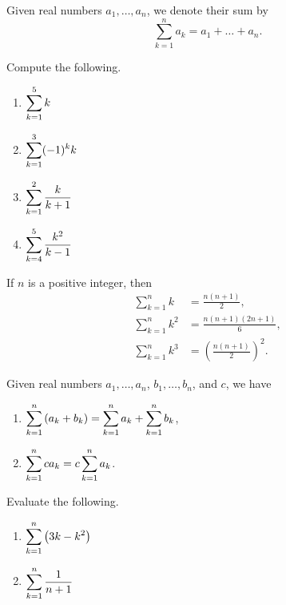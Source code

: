 \setcounter{chapter}{5}
\setcounter{section}{2}
\setcounter{theorem}{0}
\setcounter{equation}{0}


\begin{definition}
Given real numbers $a_1,\dots, a_n$, we denote their sum by
\begin{equation*}
\sum_{k=1}^na_k = a_1+\dots + a_n.
\end{equation*}
\end{definition}

\begin{example}
Compute the following.
\begin{enumerate}
\item $\displaystyle\sum_{k=1}^5 k$
\vfill
\item $\displaystyle\sum_{k=1}^3 (-1)^kk$
\vfill
\item $\displaystyle\sum_{k=1}^2 \frac{k}{k+1}$
\vfill
\item $\displaystyle\sum_{k=4}^5 \frac{k^2}{k-1}$
\vfill
\end{enumerate}
\end{example}

\newpage

\begin{theorem}
If $n$ is a positive integer, then
\begin{align}
\sum_{k=1}^nk &= \frac{n(n+1)}{2},\label{sum of consecutive integers}\\
\sum_{k=1}^nk^2 &= \frac{n(n+1)(2n+1)}{6},\\
\sum_{k=1}^nk^3 &= \left(\frac{n(n+1)}{2}\right)^2.
\end{align}
\end{theorem}

\begin{theorem}
Given real numbers $a_1,\dots, a_n$, $b_1,\dots, b_n$, and $c$, we have
\begin{enumerate}
\item $\displaystyle\sum_{k=1}^n\left(a_k+b_k\right) = \sum_{k=1}^na_k + \sum_{k=1}^nb_k$,
\item $\displaystyle\sum_{k=1}^n ca_k = c\sum_{k=1}^na_k$.
\end{enumerate}
\end{theorem}

\begin{example}
Evaluate the following.
\begin{enumerate}[label=(\alph*)]
\item $\displaystyle\sum_{k=1}^n\left(3k-k^2\right)$
\vfill
\item $\displaystyle\sum_{k=1}^n\frac{1}{n+1}$
\vfill
\end{enumerate}
\end{example}

